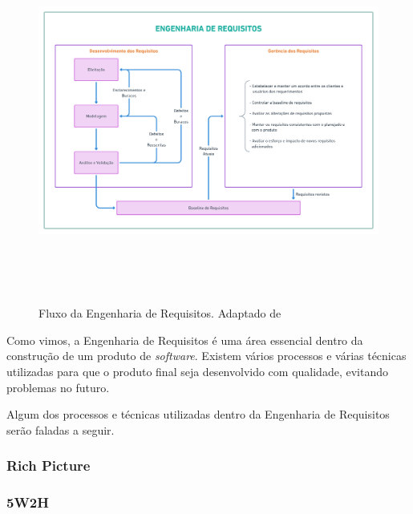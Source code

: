 \begin{itemize}
    \begin{figure}[htb]
        \begin{center}
            \includegraphics[width=12cm,height=12cm,keepaspectratio]{figuras/Introducao/eng_req_fluxo.png}
            \caption{{Fluxo da Engenharia de Requisitos. Adaptado de \cite{westfall_5w2h}}}
            \label{eng_req_flux}
        \end{center}
    \end{figure}
    
\end{itemize}

Como vimos, a Engenharia de Requisitos é uma área essencial dentro da construção de um produto de \textit{software}. Existem vários processos e várias técnicas utilizadas para que o produto final seja desenvolvido com qualidade, evitando problemas no futuro.

Algum dos processos e técnicas utilizadas dentro da Engenharia de Requisitos serão faladas a seguir.

\subsubsection{Rich Picture}

\subsubsection{5W2H}

